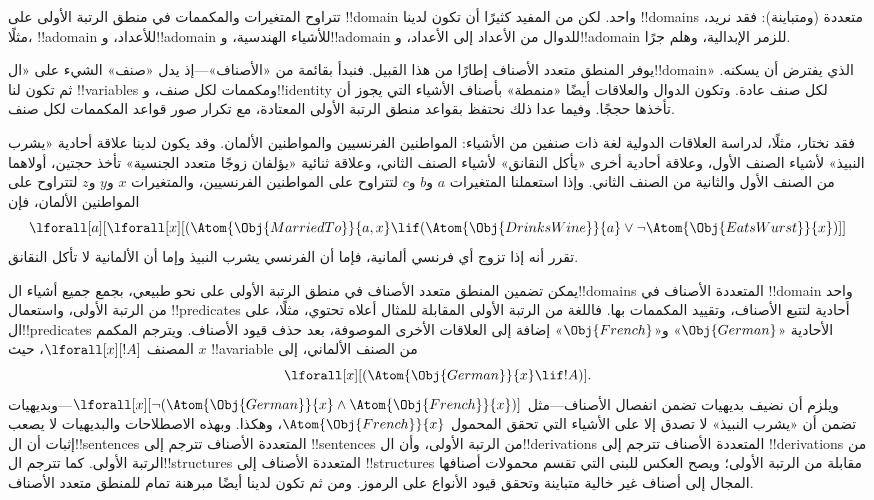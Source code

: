 \documentclass[../../../include/open-logic-section]{subfiles}
\begin{document}


تتراوح المتغيرات والمكممات في منطق الرتبة الأولى على !!{domain} واحد.
لكن من المفيد كثيرًا أن تكون لدينا !!{domain}s متعددة (ومتباينة): فقد
نريد، مثلًا، !!a{domain} للأعداد، و!!a{domain} للأشياء الهندسية،
و!!a{domain} للدوال من الأعداد إلى الأعداد، و!!a{domain} للزمر
الإبدالية، وهلم جرًا.

يوفر المنطق متعدد الأصناف إطارًا من هذا القبيل. فنبدأ بقائمة من
«الأصناف»---إذ يدل «صنف» الشيء على «ال!!{domain}» الذي يفترض أن يسكنه.
ثم تكون لنا !!{variable}s ومكممات لكل صنف، و!!{identity} لكل صنف
عادة. وتكون الدوال والعلاقات أيضًا «منمطة» بأصناف الأشياء التي يجوز أن
تأخذها حججًا. وفيما عدا ذلك نحتفظ بقواعد منطق الرتبة الأولى المعتادة،
مع تكرار صور قواعد المكممات لكل صنف.

فقد نختار، مثلًا، لدراسة العلاقات الدولية لغة ذات صنفين من الأشياء:
المواطنين الفرنسيين والمواطنين الألمان. وقد يكون لدينا علاقة أحادية
«يشرب النبيذ» لأشياء الصنف الأول، وعلاقة أحادية أخرى «يأكل النقانق»
لأشياء الصنف الثاني، وعلاقة ثنائية «يؤلفان زوجًا متعدد الجنسية» تأخذ
حجتين، أولاهما من الصنف الأول والثانية من الصنف الثاني. وإذا استعملنا
المتغيرات $a$ و$b$ و$c$ لتتراوح على المواطنين الفرنسيين، والمتغيرات
$x$ و$y$ و$z$ لتتراوح على المواطنين الألمان، فإن
\[
\lforall[a][\lforall[x][(\Atom{\Obj{MarriedTo}}{a,x} \lif
(\Atom{\Obj{DrinksWine}}{a} \lor \lnot \Atom{\Obj{EatsWurst}}{x})]]
\]
تقرر أنه إذا تزوج أي فرنسي ألمانية، فإما أن الفرنسي يشرب النبيذ وإما
أن الألمانية لا تأكل النقانق.

يمكن تضمين المنطق متعدد الأصناف في منطق الرتبة الأولى على نحو طبيعي،
بجمع جميع أشياء ال!!{domain}s المتعددة الأصناف في !!{domain} واحد من
الرتبة الأولى، واستعمال !!{predicate}s أحادية لتتبع الأصناف، وتقييد
المكممات بها. فاللغة من الرتبة الأولى المقابلة للمثال أعلاه تحتوي،
مثلًا، على ال!!{predicate}s الأحادية «$\Obj{German}$» و«$\Obj{French}$»
إضافة إلى العلاقات الأخرى الموصوفة، بعد حذف قيود الأصناف. ويترجم
المكمم المصنف $\lforall[x][!A]$، حيث $x$ !!a{variable} من الصنف
الألماني، إلى
\[
\lforall[x][(\Atom{\Obj{German}}{x} \lif !A)].
\]
ويلزم أن نضيف بديهيات تضمن انفصال الأصناف---مثل
$\lforall[x][\lnot (\Atom{\Obj{German}}{x} \land
  \Atom{\Obj{French}}{x})]$---وبديهيات تضمن أن «يشرب النبيذ» لا تصدق
إلا على الأشياء التي تحقق المحمول $\Atom{\Obj{French}}{x}$، وهكذا.
وبهذه الاصطلاحات والبديهيات لا يصعب إثبات أن ال!!{sentence}s المتعددة
الأصناف تترجم إلى !!{sentence}s من الرتبة الأولى، وأن ال!!{derivation}s
المتعددة الأصناف تترجم إلى !!{derivation}s من الرتبة الأولى. كما تترجم
ال!!{structure}s المتعددة الأصناف إلى !!{structure}s مقابلة من الرتبة
الأولى؛ ويصح العكس للبنى التي تقسم محمولات أصنافها المجال إلى أصناف
غير خالية متباينة وتحقق قيود الأنواع على الرموز. ومن ثم تكون لدينا
أيضًا مبرهنة تمام للمنطق متعدد الأصناف.
\end{document}
